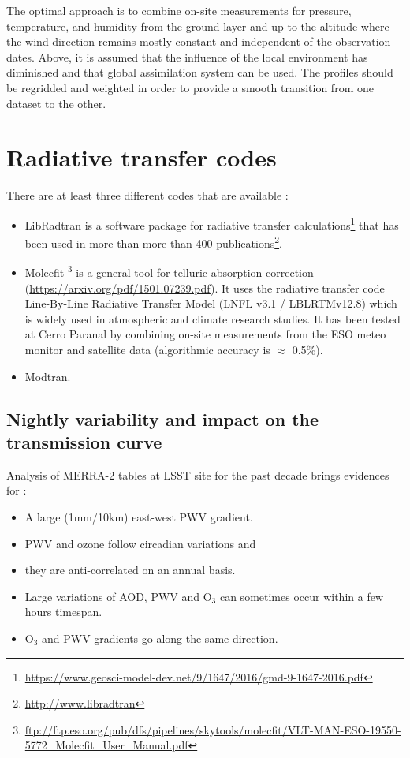 \documentclass[onecolumn]{aa}
\begin{document}
The optimal approach is to combine on-site measurements for pressure, temperature,
and humidity from the ground layer and up to the altitude where the wind direction remains mostly constant and independent of the observation dates. Above, it is assumed that the influence of the local environment has diminished and that global assimilation system can be used. The profiles should be regridded and weighted in order to provide a smooth transition from one dataset to the other.



\section{Radiative transfer codes}

There are at least three different codes that are available :
\begin{itemize}
\item LibRadtran is a software package for radiative transfer calculations\footnote{\url{https://www.geosci-model-dev.net/9/1647/2016/gmd-9-1647-2016.pdf}}
that has been used in more than more than 400 publications\footnote{\url{http://www.libradtran}}.
\item Molecfit \footnote{\url{ftp://ftp.eso.org/pub/dfs/pipelines/skytools/molecfit/VLT-MAN-ESO-19550-5772_Molecfit_User_Manual.pdf}} is a general tool for telluric absorption correction (\url{https://arxiv.org/pdf/1501.07239.pdf}). It uses the radiative transfer code Line-By-Line Radiative Transfer Model (LNFL v3.1 / LBLRTMv12.8) which is widely used in atmospheric and climate research studies. It has been tested at Cerro Paranal by combining on-site measurements from the ESO meteo monitor and satellite data (algorithmic accuracy is $\approx$ 0.5\%).
\item Modtran.
\end{itemize}



\subsection{Nightly variability and impact on the transmission curve}


Analysis of MERRA-2 tables at LSST site for the past decade brings evidences for :
\begin{itemize}
\item A large (1mm/10km) east-west PWV gradient.
\item PWV and ozone follow circadian variations and
\item they are anti-correlated on an annual basis.
\item Large variations of AOD, PWV and O$_3$ can sometimes occur within a few hours timespan. 
\item O$_3$ and PWV gradients go along the same direction.
\end{itemize}
\end{document}
